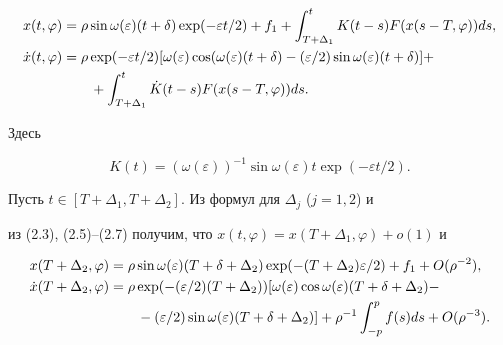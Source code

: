 \begin{align}


x(t,\varphi)&=\rho\sin\omega(\varepsilon)(t+\delta)


\exp(-\varepsilon t/2)+f_1 +


\int^t_{T+\Delta_1}K(t-s)F(x(s-T,\varphi))ds, \\


%


\Dot x(t,\varphi)&=\rho\exp(-\varepsilon t/2)


[\omega(\varepsilon)\cos(\omega(\varepsilon)(t+\delta)- ( \varepsilon/2 )


\sin\omega(\varepsilon)(t+\delta)] +\notag \\


&\qquad+\int^t_{T+\Delta_1}\Dot K(t-s)F(x(s-T,\varphi))ds.


\end{align}


Здесь


\begin{equation}


K(t)=(\omega(\varepsilon))^{-1}\sin\omega(\varepsilon)t\exp(-\varepsilon t/2).


\end{equation}


Пусть $t\in[T+\Delta_1,T+\Delta_2]$. Из формул для $\Delta_j$ ($j=1,2$) и


из (2.3), (2.5)--(2.7) получим, что $x(t,\varphi)=x(T+\Delta_1,\varphi)+


o(1)$ и


\begin{align}


x(T+\Delta_2,\varphi) &= \rho\sin\omega(\varepsilon)(T+\delta+\Delta_2)


\exp(- (T+\Delta_2)\varepsilon /2) + f_1 + O(\rho^{-2}), \\


%


\Dot x(T+\Delta_2,\varphi) &= \rho\exp(- (\varepsilon/2)(T+\Delta_2))[


\omega(\varepsilon)\cos\omega(\varepsilon)(T+\delta+\Delta_2) -\notag\\


%


&\qquad- (\varepsilon/2) \sin\omega(\varepsilon)(T+\delta+\Delta_2)] +


\rho^{-1}\int_{-p}^p f(s)ds + O(\rho^{-3}).


\end{align}


